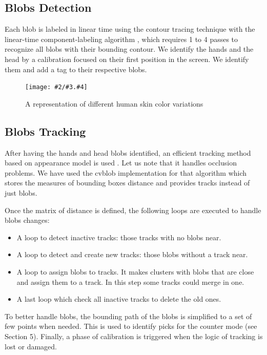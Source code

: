 \documentclass{llncs}
\newcommand{\imagepathext}[5]{%
\begin{figure}[!htbp]
\hfil\texttt{[image: \#2/\#3.\#4]}\hfil
\caption{#5\label{#3}}
\end{figure}}
\newcommand{\png}[2]{\imagepathext{width=\columnwidth}{pics}{#1}{png}{#2}}
\begin{document}
\subsection{Blobs Detection}
Each blob is labeled in linear time using the contour tracing technique with
the linear-time component-labeling algorithm \cite{CompLabeling},
which requires 1 to 4 passes to recognize all blobs with their bounding contour.
We identify the hands and the head by a calibration focused on their first
position in the screen. We identify them and add a tag to their respective blobs.

\png{skincolor}{A representation of different human skin color variations}

\subsection{Blobs Tracking}
After having the hands and head blobs identified, an efficient
tracking method based on appearance model is used \cite{app06}. Let us note that it handles occlusion problems.
We have used the cvblob implementation \cite{cvblob} for that algorithm which
stores the measures of bounding boxes distance and provides tracks instead of just blobs. %

Once the matrix of distance is defined, the following loops
are executed to handle blobs changes:
\begin{itemize}
 \item A loop to detect inactive tracks: those tracks with no blobs near.
 \item A loop to detect and create new tracks: those blobs without a track near.
 \item A loop to assign blobs to tracks. It makes clusters with blobs that are close and assign them to a track.
In this step some tracks could merge in one.
 \item A last loop which check all inactive tracks to delete the old ones.
\end{itemize}

To better handle blobs, the bounding path of the blobs
is simplified to a set of few points when needed.
This is used to identify picks for the counter mode (see Section 5). Finally, a phase of calibration is triggered when the logic of tracking is lost or damaged.
\end{document}

